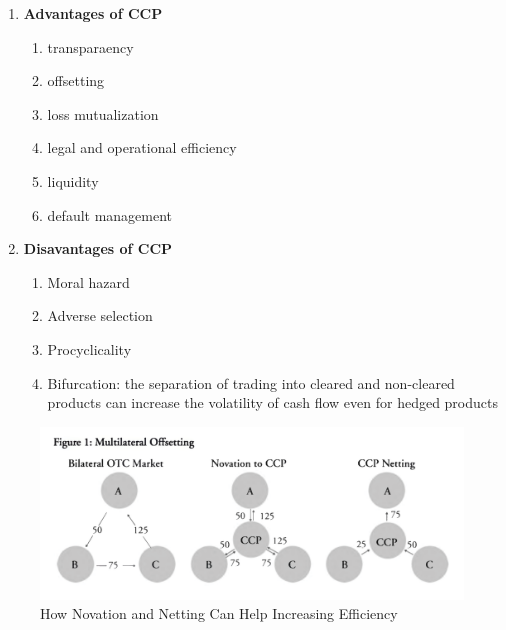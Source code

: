 \documentclass[11pt,fleqn]{report} %
\numberwithin{equation}{section} %
\numberwithin{figure}{section} %
\numberwithin{table}{section} %
\begin{document}
 \begin{definition}
    \begin{enumerate}
        \item \textbf{Advantages of CCP}
        \begin{enumerate}
            \item transparaency
            \item offsetting
            \item loss mutualization
            \item legal and operational efficiency
            \item liquidity
            \item default management
        \end{enumerate}
        \item \textbf{Disavantages of CCP}
        \begin{enumerate}
            \item Moral hazard
            \item Adverse selection
            \item Procyclicality
            \item Bifurcation: the separation of trading into cleared and non-cleared
            products can increase the volatility of cash flow even for hedged products
        \end{enumerate}
    \end{enumerate}
 \end{definition}
 \begin{figure}[h!]
    \begin{center}
        \includegraphics[scale=0.7]{clearing.png}
        \caption{How Novation and Netting Can Help Increasing Efficiency}
    \end{center}
 \end{figure}
\end{document}
